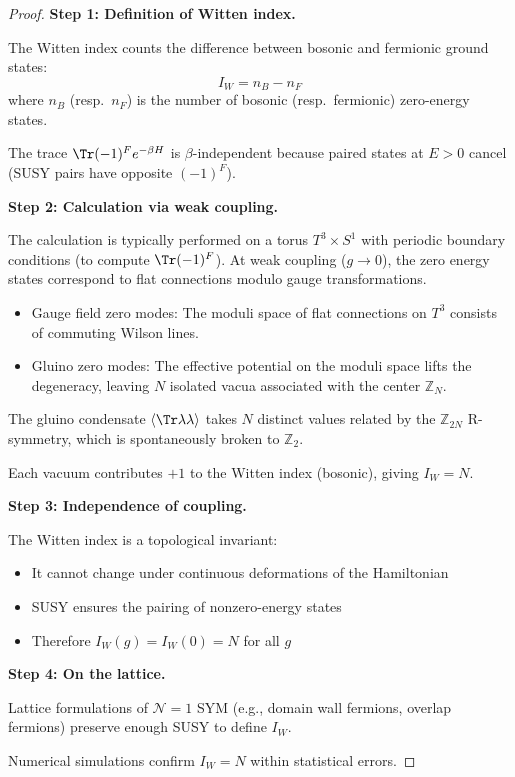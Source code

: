 \begin{proof}
\textbf{Step 1: Definition of Witten index.}

The Witten index counts the difference between bosonic and fermionic ground states:
\[
I_W = n_B - n_F
\]
where $n_B$ (resp.\ $n_F$) is the number of bosonic (resp.\ fermionic) zero-energy states.

The trace $\Tr(-1)^F e^{-\beta H}$ is $\beta$-independent because paired states 
at $E > 0$ cancel (SUSY pairs have opposite $(-1)^F$).

\textbf{Step 2: Calculation via weak coupling.}

The calculation is typically performed on a torus $T^3 \times S^1$ with periodic boundary conditions (to compute $\Tr (-1)^F$). At weak coupling ($g \to 0$), the zero energy states correspond to flat connections modulo gauge transformations.
\begin{itemize}
\item Gauge field zero modes: The moduli space of flat connections on $T^3$ consists of commuting Wilson lines.
\item Gluino zero modes: The effective potential on the moduli space lifts the degeneracy, leaving $N$ isolated vacua associated with the center $\mathbb{Z}_N$.
\end{itemize}

The gluino condensate $\langle \Tr\lambda\lambda \rangle$ takes $N$ distinct values 
related by the $\mathbb{Z}_{2N}$ R-symmetry, which is spontaneously broken to $\mathbb{Z}_2$.

Each vacuum contributes $+1$ to the Witten index (bosonic), giving $I_W = N$.

\textbf{Step 3: Independence of coupling.}

The Witten index is a topological invariant:
\begin{itemize}
\item It cannot change under continuous deformations of the Hamiltonian
\item SUSY ensures the pairing of nonzero-energy states
\item Therefore $I_W(g) = I_W(0) = N$ for all $g$
\end{itemize}

\textbf{Step 4: On the lattice.}

Lattice formulations of $\mathcal{N}=1$ SYM (e.g., domain wall fermions, 
overlap fermions) preserve enough SUSY to define $I_W$.

Numerical simulations confirm $I_W = N$ within statistical errors.
\end{proof}

